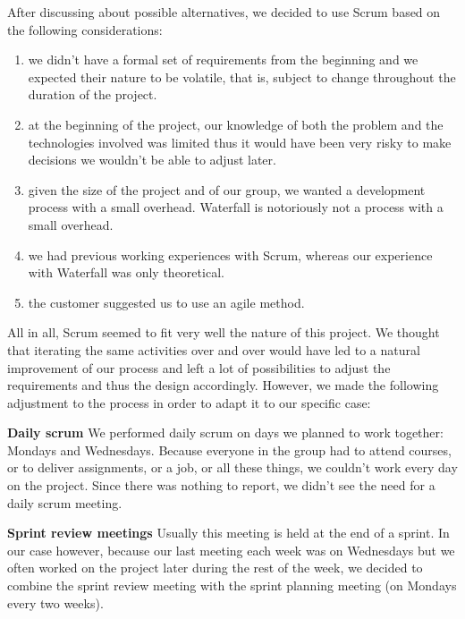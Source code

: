 After discussing about possible alternatives, we decided to use Scrum based on the following considerations:

\begin{enumerate}
\item we didn't have a formal set of requirements from the beginning and we expected their nature to be volatile,
that is, subject to change throughout the duration of the project.

\item at the beginning of the project, our knowledge of both the problem and the technologies involved was
limited thus it would have been very risky to make decisions we wouldn't be able to adjust later.

\item given the size of the project and of our group, we wanted a development process with a small overhead.
Waterfall is notoriously not a process with a small overhead.

\item we had previous working experiences with Scrum, whereas our experience with Waterfall was only theoretical.

\item the customer suggested us to use an agile method.

\end{enumerate}

All in all, Scrum seemed to fit very well the nature of this project.
We thought that iterating the same activities over and over would have led to a natural improvement of our process and left a lot of possibilities to adjust the requirements and thus the design accordingly.
However, we made the following adjustment to the process in order to adapt it to our specific case:

\textbf{Daily scrum}\newline
We performed daily scrum on days we planned to work together: Mondays and Wednesdays.
Because everyone in the group had to attend courses, or to deliver assignments, or a job, or all these things, we couldn't work every day on the project. 
Since there was nothing to report, we didn't see the need for a daily scrum meeting.

\textbf{Sprint review meetings}\newline
Usually this meeting is held at the end of a sprint. 
In our case however, because our last meeting each week was on Wednesdays but we often worked on the project later during the rest of the week, we decided to combine the sprint review meeting with the sprint planning meeting (on Mondays every two weeks).


